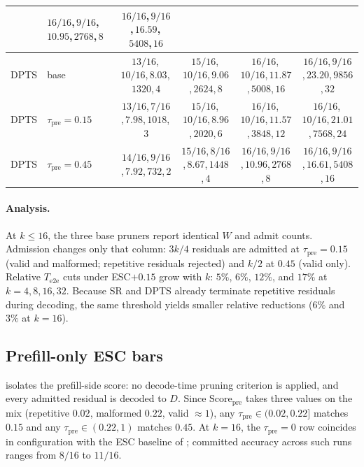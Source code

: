 \begin{table}[t]
\begin{tabular}{@{}llcccc@{}}
 & $16/16$,\,$9/16$,\,$10.95$,\,$2768$,\,$8$
 & $16/16$,\,$9/16$,\,$16.59$,\,$5408$,\,$16$ \\
\midrule
DPTS
 & base
 & $13/16$,\,$10/16$,\,$8.03$,\,$1320$,\,$4$
 & $15/16$,\,$10/16$,\,$9.06$,\,$2624$,\,$8$
 & $16/16$,\,$10/16$,\,$11.87$,\,$5008$,\,$16$
 & $16/16$,\,$9/16$,\,$23.20$,\,$9856$,\,$32$ \\
\rowcolor{tblalt}
DPTS
 & $\tau_{\mathrm{pre}}{=}0.15$
 & $13/16$,\,$7/16$,\,$7.98$,\,$1018$,\,$3$
 & $15/16$,\,$10/16$,\,$8.96$,\,$2020$,\,$6$
 & $16/16$,\,$10/16$,\,$11.57$,\,$3848$,\,$12$
 & $16/16$,\,$10/16$,\,$21.01$,\,$7568$,\,$24$ \\
DPTS
 & $\tau_{\mathrm{pre}}{=}0.45$
 & $14/16$,\,$9/16$,\,$7.92$,\,$732$,\,$2$
 & $15/16$,\,$8/16$,\,$8.67$,\,$1448$,\,$4$
 & $16/16$,\,$9/16$,\,$10.96$,\,$2768$,\,$8$
 & $16/16$,\,$9/16$,\,$16.61$,\,$5408$,\,$16$ \\
\bottomrule
\end{tabular}
\end{table}

\paragraph{Analysis.}
At $k\le16$, the three base pruners report identical $W$ and admit counts.
Admission changes only that column: $3k/4$ residuals are admitted at $\tau_{\mathrm{pre}}{=}0.15$
(valid and malformed; repetitive residuals rejected) and $k/2$ at $0.45$ (valid only).
Relative $T_{\mathrm{e2e}}$ cuts under ESC${+}0.15$ grow with $k$:
$5\%$, $6\%$, $12\%$, and $17\%$ at $k{=}4,8,16,32$.
Because SR and DPTS already terminate repetitive residuals during decoding, the same threshold yields smaller relative reductions
($6\%$ and $3\%$ at $k{=}16$).

\subsection{Prefill-only ESC bars}
\label{sec:ablate-prefill}

 isolates the prefill-side score: no decode-time pruning criterion is applied, and every admitted residual is decoded to $D$.
Since $\mathrm{Score}_{\mathrm{pre}}$ takes three values on the mix (repetitive $0.02$, malformed $0.22$, valid $\approx1$), any $\tau_{\mathrm{pre}}\in(0.02,0.22]$ matches $0.15$ and any $\tau_{\mathrm{pre}}\in(0.22,1)$ matches $0.45$.
At $k{=}16$, the $\tau_{\mathrm{pre}}{=}0$ row coincides in configuration with the ESC baseline of ; committed accuracy across such runs ranges from $8/16$ to $11/16$.

